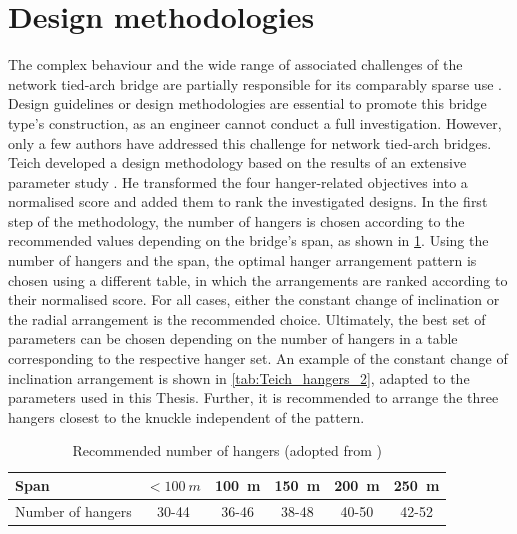 \section{Design methodologies} \label{sec:rev_meth}
The complex behaviour and the wide range of associated challenges of the network tied-arch bridge are partially responsible for its comparably sparse use \cite{Tveit_How}. Design guidelines or design methodologies are essential to promote this bridge type's construction, as an engineer cannot conduct a full investigation. However, only a few authors have addressed this challenge for network tied-arch bridges.
Teich developed a design methodology based on the results of an extensive parameter study \cite{Teich}. He transformed the four hanger-related objectives into a normalised score and added them to rank the investigated designs. In the first step of the methodology, the number of hangers is chosen according to the recommended values depending on the bridge's span, as shown in \cref{tab:Teich_hangers}. Using the number of hangers and the span, the optimal hanger arrangement pattern is chosen using a different table, in which the arrangements are ranked according to their normalised score. For all cases, either the constant change of inclination or the radial arrangement is the recommended choice. Ultimately, the best set of parameters can be chosen depending on the number of hangers in a table corresponding to the respective hanger set. An example of the constant change of inclination arrangement is shown in \cref{tab:Teich_hangers_2}, adapted to the parameters used in this Thesis. Further, it is recommended to arrange the three hangers closest to the knuckle independent of the pattern.

\begin{table}[H]
\centering
\caption{Recommended number of hangers (adopted from \cite{Teich})}
\label{tab:Teich_hangers}
\begin{tabular}{lccccc}
\toprule
Span & $< \SI{100}{m}$ & \SI{100}{m} & \SI{150}{m} & \SI{200}{m} & \SI{250}{m} \\ \midrule
Number of hangers & 30-44 & 36-46 & 38-48 & 40-50 & 42-52 \\ \bottomrule
\end{tabular}
\end{table}

